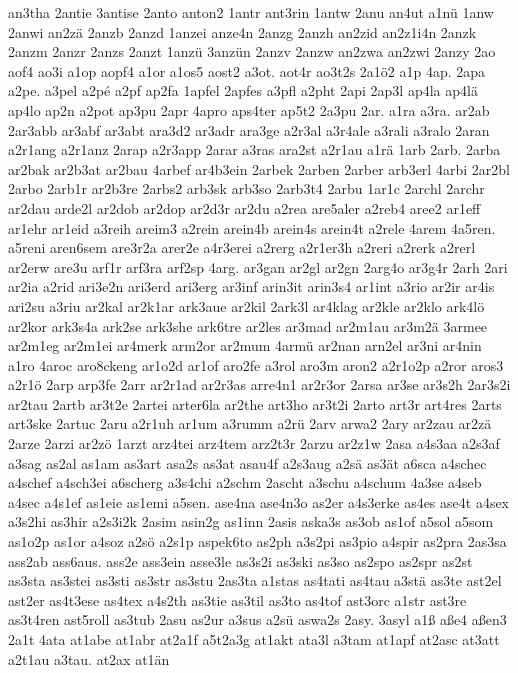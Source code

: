 {an3tha
2antie
3antise
2anto
anton2
1antr
ant3rin
1antw
2anu
an4ut
a1nü
1anw
2anwi
an2zä
2anzb
2anzd
1anzei
anze4n
2anzg
2anzh
an2zid
an2z1i4n
2anzk
2anzm
2anzr
2anzs
2anzt
1anzü
3anzün
2anzv
2anzw
an2zwa
an2zwi
2anzy
2ao
aof4
ao3i
a1op
aopf4
a1or
a1os5
aost2
a3ot.
aot4r
ao3t2s
2a1ö2
a1p
4ap.
2apa
a2pe.
a3pel
a2pé
a2pf
ap2fa
1apfel
2apfes
a3pfl
a2pht
2api
2ap3l
ap4la
ap4lä
ap4lo
ap2n
a2pot
ap3pu
2apr
4apro
aps4ter
ap5t2
2a3pu
2ar.
a1ra
a3ra.
ar2ab
2ar3abb
ar3abf
ar3abt
ara3d2
ar3adr
ara3ge
a2r3al
a3r4ale
a3rali
a3ralo
2aran
a2r1ang
a2r1anz
2arap
a2r3app
2arar
a3ras
ara2st
a2r1au
a1rä
1arb
2arb.
2arba
ar2bak
ar2b3at
ar2bau
4arbef
ar4b3ein
2arbek
2arben
2arber
arb3erl
4arbi
2ar2bl
2arbo
2arb1r
ar2b3re
2arbs2
arb3sk
arb3so
2arb3t4
2arbu
1ar1c
2archl
2archr
ar2dau
arde2l
ar2dob
ar2dop
ar2d3r
ar2du
a2rea
are5aler
a2reb4
aree2
ar1eff
ar1ehr
ar1eid
a3reih
areim3
a2rein
arein4b
arein4s
arein4t
a2rele
4arem
4a5ren.
a5reni
aren6sem
are3r2a
arer2e
a4r3erei
a2rerg
a2r1er3h
a2reri
a2rerk
a2rerl
ar2erw
are3u
arf1r
arf3ra
arf2sp
4arg.
ar3gan
ar2gl
ar2gn
2arg4o
ar3g4r
2arh
2ari
ar2ia
a2rid
ari3e2n
ari3erd
ari3erg
ar3inf
arin3it
arin3s4
ar1int
a3rio
ar2ir
ar4is
ari2su
a3riu
ar2kal
ar2k1ar
ark3aue
ar2kil
2ark3l
ar4klag
ar2kle
ar2klo
ark4lö
ar2kor
ark3s4a
ark2se
ark3she
ark6tre
ar2les
ar3mad
ar2m1au
ar3m2ä
3armee
ar2m1eg
ar2m1ei
ar4merk
arm2or
ar2mum
4armü
ar2nan
arn2el
ar3ni
ar4nin
a1ro
4aroc
aro8ckeng
ar1o2d
ar1of
aro2fe
a3rol
aro3m
aron2
a2r1o2p
a2ror
aros3
a2r1ö
2arp
arp3fe
2arr
ar2r1ad
ar2r3as
arre4n1
ar2r3or
2arsa
ar3se
ar3s2h
2ar3s2i
ar2tau
2artb
ar3t2e
2artei
arter6la
ar2the
art3ho
ar3t2i
2arto
art3r
art4res
2arts
art3ske
2artuc
2aru
a2r1uh
ar1um
a3rumm
a2rü
2arv
arwa2
2ary
ar2zau
ar2zä
2arze
2arzi
ar2zö
1arzt
arz4tei
arz4tem
arz2t3r
2arzu
ar2z1w
2asa
a4s3aa
a2s3af
a3sag
as2al
as1am
as3art
asa2s
as3at
asau4f
a2s3aug
a2sä
as3ät
a6sca
a4schec
a4schef
a4sch3ei
a6scherg
a3s4chi
a2schm
2ascht
a3schu
a4schum
4a3se
a4seb
a4sec
a4s1ef
as1eie
as1emi
a5sen.
ase4na
ase4n3o
as2er
a4s3erke
as4es
ase4t
a4sex
a3s2hi
as3hir
a2s3i2k
2asim
asin2g
as1inn
2asis
aska3s
as3ob
as1of
a5sol
a5som
as1o2p
as1or
a4soz
a2sö
a2s1p
aspek6to
as2ph
a3s2pi
as3pio
a4spir
as2pra
2as3sa
ass2ab
ass6aus.
ass2e
ass3ein
asse3le
as3s2i
as3ski
as3so
as2spo
as2spr
as2st
as3sta
as3stei
as3sti
as3str
as3stu
2as3ta
a1stas
as4tati
as4tau
a3stä
as3te
ast2el
ast2er
as4t3ese
as4tex
a4s2th
as3tie
as3til
as3to
as4tof
ast3orc
a1str
ast3re
as3t4ren
ast5roll
as3tub
2asu
as2ur
a3sus
a2sü
aswa2s
2asy.
3asyl
a1ß
aße4
aßen3
2a1t
4ata
at1abe
at1abr
at2a1f
a5t2a3g
at1akt
ata3l
a3tam
at1apf
at2asc
at3att
a2t1au
a3tau.
at2ax
at1än
}
